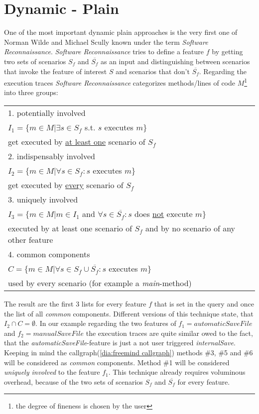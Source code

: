 \section{Dynamic - Plain}
One of the most important dynamic plain approaches is the very first one of Norman Wilde and Michael Scully known under the term \emph{Software Reconnaissance}. \textit{Software Reconnaissance} tries to define a feature $f$ by getting two sets of scenarios $S_f$ and $\overline{S_f}$ as an input and distinguishing between scenarios that invoke the feature of interest $S$ and scenarios that don't $\overline{S_f}$. \newline
Regarding the execution traces \textit{Software Reconnaissance} categorizes methods/lines of code $M$\footnote{the degree of fineness is chosen by the user} into three groups:
\begin{table}[h]
	\begin{tabular}{l}
		1. potentially involved  \\
 		\qquad $I_1 = \{ m \in M | \exists s \in S_f$ s.t. $s$ executes $m \}$ \\
 		\qquad get executed by \underline{at least one} scenario of $S_f$\\
		2. indispensably involved  \\
		\qquad $I_2 = \{ m \in M | \forall s \in S_f : s$ executes $m \}$ \\
		\qquad get executed by \underline{every} scenario of $S_f$\\
		3. uniquely involved  \\
		\qquad $I_3 = \{ m \in M | m \in I_1$ and $\forall s\in \overline{S_f} : s$ does \underline{not} execute $m \}$ \\
		\qquad executed by at least one scenario of $S_f$ and by no scenario of any other feature\\
		4. common components  \\
		\qquad $C = \{ m \in M | \forall s \in S_f \cup \overline{S_f}:s$ executes $m \}$ \\
		\qquad used by every scenario (for example a \textit{main}-method)
	\end{tabular}
\end{table}
The result are the first 3 lists for every feature $f$ that is set in the query and once the list of all \textit{common} components. Different versions of this technique state, that $I_2 \cap C = \emptyset$.\cite{wilde1995software} \newline
\emptyLine
In our example regarding the two features of $f_1 = automaticSaveFile$ and $f_2 = manualSaveFile$ the execution traces are quite similar owed to the fact, that the \textit{automaticSaveFile}-feature is just a not user triggered \textit{internalSave}. Keeping in mind the callgraph(\autoref{dia:freemind callgraph}) methods \#3, \#5 and \#6 will be considered as \textit{common} components. Method \#1 will be considered \textit{uniquely involved} to the feature $f_1$. \newline
\emptyLine
This technique already requires voluminous overhead, because of the two sets of scenarios $S_f$ and $\overline{S_f}$ for every feature.


